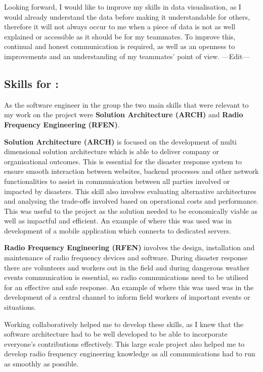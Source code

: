 \documentclass[a4paper, 11pt]{report}
\begin{document}
Looking forward, I would like to improve my skills in data visualisation, as I would already understand the data before making it understandable for others, therefore it will not always occur to me when a piece of data is not as well explained or accessible as it should be for my teammates. To improve this, continual and honest communication is required, as well as an openness to improvements and an understanding of my teammates’ point of view.\newline
---Edit---
\newpage

\subsection{Skills for \majC: \studC}

As the software engineer in the group the two main skills that were relevant to my work on the project were \textbf{Solution Architecture (ARCH)} and \textbf{Radio Frequency Engineering (RFEN)}.\newline


\textbf{Solution Architecture (ARCH)} is focused on the development of multi dimensional solution architecture which is able to deliver company or organisational outcomes. This is essential for the disaster response system to ensure smooth interaction between websites, backend processes and other network functionalities to assist in communication between all parties involved or impacted by disasters. This skill also involves evaluating alternative architectures and analysing the trade-offs involved based on operational costs and performance. This was useful to the project as the solution needed to be economically viable as well as impactful and efficient. An example of where this was used was in development of a mobile application which connects to dedicated servers.\newline


\textbf{Radio Frequency Engineering (RFEN)} involves the design, installation and maintenance of radio frequency devices and software. During disaster response there are volunteers and workers out in the field and during dangerous weather events communication is essential, so radio communications need to be utilised for an effective and safe response. An example of where this was used was in the development of a central channel to inform field workers of important events or situations.\newline

Working collaboratively helped me to develop these skills, as I knew that the software architecture had to be well developed to be able to incorporate everyone's contributions effectively. This large scale project also helped me to develop radio frequency engineering knowledge as all communications had to run as smoothly as possible.\newline
\end{document}
